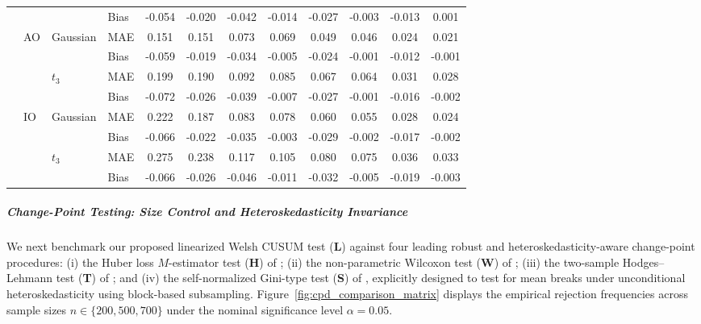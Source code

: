 \documentclass[10pt, a4paper]{article}
\theoremstyle{assumption}
\theoremstyle{definition}
\theoremstyle{theorem}
\begin{document}
\begin{table}[ht]
{\begin{tabular}{clllcc|cc|cc|cc}
& & & Bias & -0.054 & -0.020 & -0.042 & -0.014 & -0.027 & -0.003 & -0.013 & 0.001 \\
\cmidrule{2-12}
& \multirow{4}{*}{AO} & \multirow{2}{*}{Gaussian} & MAE & 0.151 & 0.151 & 0.073 & 0.069 & 0.049 & 0.046 & 0.024 & 0.021 \\
& & & Bias & -0.059 & -0.019 & -0.034 & -0.005 & -0.024 & -0.001 & -0.012 & -0.001 \\
\cmidrule{3-12}
& & \multirow{2}{*}{$t_3$} & MAE & 0.199 & 0.190 & 0.092 & 0.085 & 0.067 & 0.064 & 0.031 & 0.028 \\
& & & Bias & -0.072 & -0.026 & -0.039 & -0.007 & -0.027 & -0.001 & -0.016 & -0.002 \\
\cmidrule{2-12}
& \multirow{4}{*}{IO} & \multirow{2}{*}{Gaussian} & MAE & 0.222 & 0.187 & 0.083 & 0.078 & 0.060 & 0.055 & 0.028 & 0.024 \\
& & & Bias & -0.066 & -0.022 & -0.035 & -0.003 & -0.029 & -0.002 & -0.017 & -0.002 \\
\cmidrule{3-12}
& & \multirow{2}{*}{$t_3$} & MAE & 0.275 & 0.238 & 0.117 & 0.105 & 0.080 & 0.075 & 0.036 & 0.033 \\
& & & Bias & -0.066 & -0.026 & -0.046 & -0.011 & -0.032 & -0.005 & -0.019 & -0.003 \\
\bottomrule
\end{tabular}
}
\end{table}

\subparagraph{Change-Point Testing: Size Control and Heteroskedasticity Invariance}
We next benchmark our proposed linearized Welsh CUSUM test (\textbf{L}) against four leading robust and heteroskedasticity-aware change-point procedures:
(i) the Huber loss $M$-estimator test (\textbf{H}) of \citet{huskova2012};
(ii) the non-parametric Wilcoxon test (\textbf{W}) of \citet{Dehling2015};
(iii) the two-sample Hodges--Lehmann test (\textbf{T}) of \citet{Dehling2020}; and
(iv) the self-normalized Gini-type test (\textbf{S}) of \citet{schmidt2021}, explicitly designed to test for mean breaks under unconditional heteroskedasticity using block-based subsampling.
Figure~\ref{fig:cpd_comparison_matrix} displays the empirical rejection frequencies across sample sizes $n \in \{200, 500, 700\}$ under the nominal significance level $\alpha = 0.05$.
\end{document}
